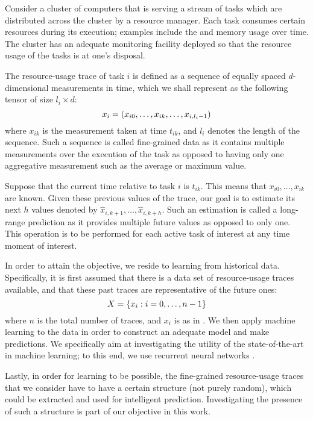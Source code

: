 Consider a cluster of computers that is serving a stream of tasks which are
distributed across the cluster by a resource manager. Each task consumes certain
resources during its execution; examples include the  and memory usage
over time. The cluster has an adequate monitoring facility deployed so that the
resource usage of the tasks is at one's disposal.

The resource-usage trace of task $i$ is defined as a sequence of equally spaced
$d$-dimensional measurements in time, which we shall represent as the following
tensor of size $l_i \times d$:
\begin{equation} \elab{trace}
  x_i = \left(x_{i0}, \dots, x_{ik}, \dots, x_{i,l_i - 1}\right)
\end{equation}
where $x_{ik}$ is the measurement taken at time $t_{ik}$, and $l_i$ denotes the
length of the sequence. Such a sequence is called fine-grained data as it
contains multiple measurements over the execution of the task as opposed to
having only one aggregative measurement such as the average or maximum value.

Suppose that the current time relative to task $i$ is $t_{ik}$. This means that
$x_{i0}, \dots, x_{ik}$ are known. Given these previous values of the trace, our
goal is to estimate its next $h$ values denoted by $\hat{x}_{i,k + 1}, \dots,
\hat{x}_{i,k + h}$. Such an estimation is called a long-range prediction as it
provides multiple future values as opposed to only one. This operation is to be
performed for each active task of interest at any time moment of interest.

In order to attain the objective, we reside to learning from historical data.
Specifically, it is first assumed that there is a data set of resource-usage
traces available, and that these past traces are representative of the future
ones:
\begin{equation} \elab{traces}
  X = \{ x_i: i = 0, \dots, n - 1 \}
\end{equation}
where $n$ is the total number of traces, and $x_i$ is as in . We
then apply machine learning to the data in order to construct an adequate model
and make predictions. We specifically aim at investigating the utility of the
state-of-the-art in machine learning; to this end, we use recurrent neural
networks \cite{goodfellow2016}.

Lastly, in order for learning to be possible, the fine-grained resource-usage
traces that we consider have to have a certain structure (not purely random),
which could be extracted and used for intelligent prediction. Investigating the
presence of such a structure is part of our objective in this work.
